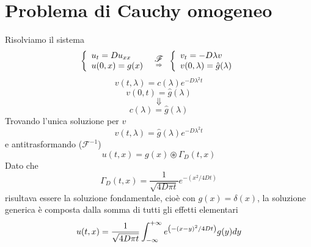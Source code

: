 \section{Problema di Cauchy omogeneo}
Risolviamo il sistema
\[
	\left\{
	\begin{array}{l}
		u_t= Du_{xx}\\
		u(0,x)= g(x)
	\end{array}
	\right.
	\substack{\displaystyle{\mathscr{F}} \\ \;\;\; \Rightarrow \;\;\;}
	\left\{
	\begin{array}{l}
		v_t= -D\lambda v\\
		v(0,\lambda)= \hat{g}(\lambda)
	\end{array}
	\right.
\]
\[
	v(t, \lambda)= c(\lambda)e^{-D\lambda^2t}
\]
\[
	v(0,t)= \hat{g}(\lambda)
\]
\[
	\Downarrow
\]
\[
	c(\lambda)= \hat{g}(\lambda)
\]
Trovando l'unica soluzione per $v$
\[
	v(t,\lambda)= \hat{g}(\lambda)e^{-D\lambda^2t}
\]
e antitrasformando ($\mathscr{F}^{-1}$)
\[
	u(t,x)= g(x) \circledast \Gamma_D(t,x)
\]
Dato che
\[
	\Gamma_D(t,x)=
	\frac{1}{\sqrt{4D\pi t}}
	e^{-\left( x^2/4Dt \right)}
\]
risultava essere la soluzione fondamentale, cio\`e con $g(x)=\delta(x)$,
la soluzione generica \`e composta dalla somma di tutti gli effetti elementari
\[
	u(t,x)= \frac{1}{\sqrt{4D\pi t}} \int_{- \infty}^{+ \infty}
	e^{\left( -(x-y)^2 / 4Dt \right)}
	g(y) dy
\]
